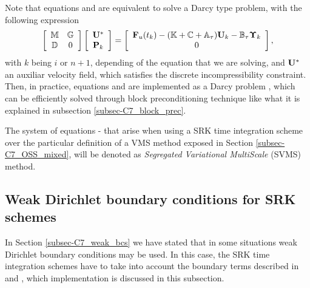 Note that equations  and  are equivalent to solve a Darcy type problem, with the following expression
\begin{equation}
\label{eq-C7_SRK_upeta_RK_p_darcy}
\left[\begin{array}{cc}
\mathbb{M}&\mathbb{G}\\
\mathbb{D}&0
\end{array}\right]\left[\begin{array}{c}
{\bf U}^*\\
{\bf P}_k
\end{array}\right]=\left[\begin{array}{c}
{\bf F}_u(t_k)-(\mathbb{K}+\mathbb{C}+\mathbb{A}_\tau){\bf U}_k-\mathbb{B}_\tau\boldsymbol{\Upsilon}_k\\
0
\end{array}\right],
\end{equation}
with $k$ being $i$ or $n+1$, depending of the equation that we are solving, and ${\bf U}^*$ an auxiliar velocity field, which satisfies the discrete incompressibility constraint. Then, in practice, equations  and  are implemented as a Darcy problem , which can be efficiently solved through block preconditioning technique like what it is explained in subsection \ref{subsec-C7_block_prec}.

The system of equations - that arise when using a SRK time integration scheme over the particular definition of a VMS method exposed in Section \ref{subsec-C7_OSS_mixed}, will be denoted as \textit{Segregated Variational MultiScale} (SVMS) method.

\subsection{Weak Dirichlet boundary conditions for SRK schemes}
In Section \ref{subsec-C7_weak_bcs} we have stated that in some situations weak Dirichlet boundary conditions may be used. In this case, the SRK time integration schemes have to take into account the boundary terms described in  and , which implementation is discussed in this subsection.

